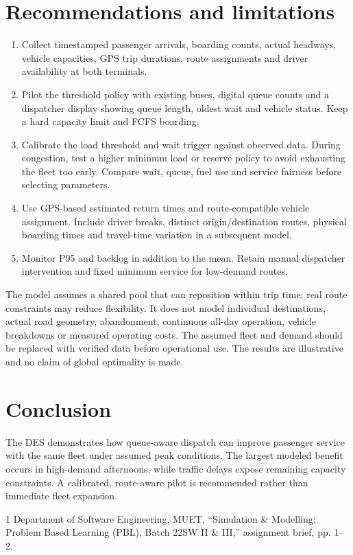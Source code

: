 \documentclass[conference]{IEEEtran}
\begin{document}
\section{Recommendations and limitations}
\begin{enumerate}
\item Collect timestamped passenger arrivals, boarding counts, actual headways, vehicle capacities, GPS trip durations, route assignments and driver availability at both terminals.
\item Pilot the threshold policy with existing buses, digital queue counts and a dispatcher display showing queue length, oldest wait and vehicle status. Keep a hard capacity limit and FCFS boarding.
\item Calibrate the load threshold and wait trigger against observed data. During congestion, test a higher minimum load or reserve policy to avoid exhausting the fleet too early. Compare wait, queue, fuel use and service fairness before selecting parameters.
\item Use GPS-based estimated return times and route-compatible vehicle assignment. Include driver breaks, distinct origin/destination routes, physical boarding times and travel-time variation in a subsequent model.
\item Monitor P95 and backlog in addition to the mean. Retain manual dispatcher intervention and fixed minimum service for low-demand routes.
\end{enumerate}
The model assumes a shared pool that can reposition within trip time; real route constraints may reduce flexibility. It does not model individual destinations, actual road geometry, abandonment, continuous all-day operation, vehicle breakdowns or measured operating costs. The assumed fleet and demand should be replaced with verified data before operational use. The results are illustrative and no claim of global optimality is made.
\section{Conclusion}
The DES demonstrates how queue-aware dispatch can improve passenger service with the same fleet under assumed peak conditions. The largest modeled benefit occurs in high-demand afternoons, while traffic delays expose remaining capacity constraints. A calibrated, route-aware pilot is recommended rather than immediate fleet expansion.
\begin{thebibliography}{1}
 Department of Software Engineering, MUET, ``Simulation \& Modelling: Problem Based Learning (PBL), Batch 22SW II \& III,'' assignment brief, pp. 1--2.
\end{thebibliography}
\end{document}

